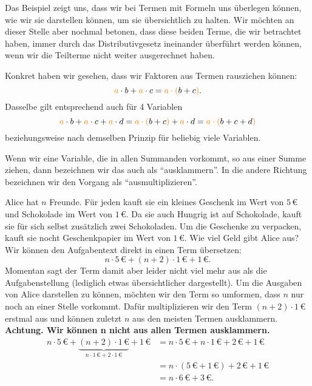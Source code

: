 \documentclass[../../main.tex]{subfiles}
\begin{document}
	Das Beispiel zeigt uns, dass wir bei Termen mit Formeln uns überlegen können, wie wir sie darstellen können, um sie übersichtlich
	zu halten. Wir möchten an dieser Stelle aber nochmal betonen, dass diese beiden Terme, die wir betrachtet haben, immer durch das
	Distributivgesetz ineinander überführt werden können, wenn wir die Teilterme nicht weiter ausgerechnet haben.

	Konkret haben wir gesehen, dass wir Faktoren aus Termen rausziehen können:
	\[{\color{orange}a}\cdot b + {\color{orange}a}\cdot c = {\color{orange}a\cdot (}b+c{\color{orange})}.\]
	Dasselbe gilt entsprechend auch für 4 Variablen
	\[{\color{orange}a}\cdot b + {\color{orange}a}\cdot c + {\color{orange}a}\cdot d = {\color{orange}a\cdot (}b+c{\color{orange})} + {\color{orange}a}\cdot d = {\color{orange}a\cdot (}b+c+d{\color{orange})}\]
	beziehungsweise nach demselben Prinzip für beliebig viele Variablen.

	Wenn wir eine Variable, die in allen Summanden vorkommt, so aus einer Summe ziehen, dann bezeichnen wir das auch als \enquote{ausklammern}.
	In die andere Richtung bezeichnen wir den Vorgang als \enquote{ausmultiplizieren}.

	\begin{example}
		Alice hat $n$ Freunde. Für jeden kauft sie ein kleines Geschenk im Wert von $5\,\euro{}$ und Schokolade im Wert von $1\,\euro{}$.
		Da sie auch Hungrig ist auf Schokolade, kauft sie für sich selbst zusätzlich zwei Schokoladen. Um die Geschenke zu verpacken, kauft sie
		nocht Geschenkpapier im Wert von $1\,\euro{}$. Wie viel Geld gibt Alice aus?\\[.5em]
		Wir können den Aufgabentext direkt in einen Term übersetzen:
		\[n\cdot 5\,\euro{}+(n+2)\cdot 1\,\euro{} + 1\,\euro{}.\]
		Momentan sagt der Term damit aber leider nicht viel mehr aus als die Aufgabenstellung (lediglich etwas übersichtlicher dargestellt).
		Um die Ausgaben von Alice darstellen zu können, möchten wir den Term so umformen, dass $n$ nur noch an einer Stelle vorkommt.
		Dafür multiplizieren wir den Term $(n+2)\cdot 1\,\euro{}$ erstmal aus und können zuletzt $n$ aus den meisten Termen ausklammern.
		\textbf{Achtung. Wir können n nicht aus allen Termen ausklammern.}
		\begin{align*}
			n\cdot 5\,\euro{} + \underbrace{(n+2)\cdot 1\,\euro{}}_{n\cdot 1\,\euro{}+2\cdot 1\,\euro{}} + 1\,\euro{} &= n\cdot 5\,\euro{}+n\cdot 1\,\euro{} + 2\,\euro{}+1\,\euro{}\\
			 &= n\cdot(5\,\euro{}+1\,\euro{})+2\,\euro{}+1\,\euro{}\\
			 &= n\cdot 6\,\euro{} + 3\,\euro{}.
		\end{align*}
	\end{example}
\end{document}

